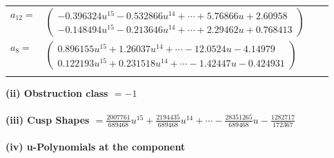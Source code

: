 \documentclass[1p]{elsarticle_modified}
\theoremstyle{definition}
\begin{document}
\begin{tabular}{m{7pt} m{180pt} m{7pt} m{180pt} }
\flushright $a_{12}=$&$\begin{pmatrix}-0.396324 u^{15}-0.532866 u^{14}+\cdots+5.76866 u+2.60958\\-0.148494 u^{15}-0.213646 u^{14}+\cdots+2.29462 u+0.768413\end{pmatrix}$ \\
\flushright $a_{8}=$&$\begin{pmatrix}0.896155 u^{15}+1.26037 u^{14}+\cdots-12.0524 u-4.14979\\0.122193 u^{15}+0.231518 u^{14}+\cdots-1.42447 u-0.424931\end{pmatrix}$\\&\end{tabular}
\flushleft \textbf{(ii) Obstruction class $= -1$}\\~\\
\flushleft \textbf{(iii) Cusp Shapes $= \frac{2007761}{689468} u^{15}+\frac{2194435}{689468} u^{14}+\cdots-\frac{28351265}{689468} u-\frac{1282717}{172367}$}\\~\\
\newpage\renewcommand{\arraystretch}{1}
\flushleft \textbf{(iv) u-Polynomials at the component}\newline \\
\end{document}
